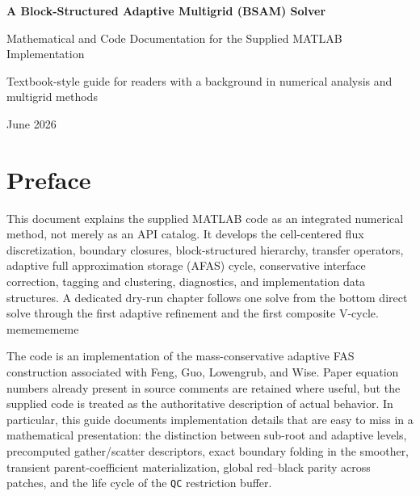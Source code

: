 \documentclass[11pt,oneside,openany]{book}
\newcommand{\code}[1]{\textnormal{\texttt{#1}}}
\begin{document}
\begin{titlepage}
\centering
\vspace*{1.1in}
{\Huge\bfseries A Block-Structured Adaptive Multigrid (BSAM) Solver\par}
\vspace{0.25in}
{\Large Mathematical and Code Documentation for the Supplied MATLAB Implementation\par}
\vspace{0.7in}
\vfill
{\large Textbook-style guide for readers with a background in numerical analysis and multigrid methods\par}
\vspace{0.25in}
{\large June 2026\par}
\end{titlepage}
\hypersetup{pageanchor=true}

\frontmatter
\chapter*{Preface}
This document explains the supplied MATLAB code as an integrated numerical method, not merely as an API catalog. It develops the cell-centered flux discretization, boundary closures, block-structured hierarchy, transfer operators, adaptive full approximation storage (AFAS) cycle, conservative interface correction, tagging and clustering, diagnostics, and implementation data structures. A dedicated dry-run chapter follows one solve from the bottom direct solve through the first adaptive refinement and the first composite V-cycle. mememememe

The code is an implementation of the mass-conservative adaptive FAS construction associated with Feng, Guo, Lowengrub, and Wise. Paper equation numbers already present in source comments are retained where useful, but the supplied code is treated as the authoritative description of actual behavior. In particular, this guide documents implementation details that are easy to miss in a mathematical presentation: the distinction between sub-root and adaptive levels, precomputed gather/scatter descriptors, exact boundary folding in the smoother, transient parent-coefficient materialization, global red--black parity across patches, and the life cycle of the \code{QC} restriction buffer.
\end{document}
